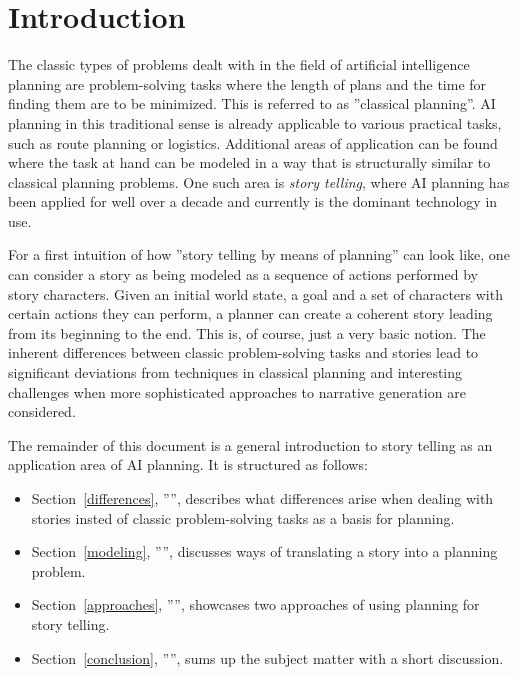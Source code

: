 \section{Introduction}
The classic types of problems dealt with in the field of artificial intelligence planning are problem-solving tasks where the length of plans and the time for finding them are to be minimized. This is referred to as ''classical planning''. AI planning in this traditional sense is already applicable to various practical tasks, such as route planning or logistics. Additional areas of application can be found where the task at hand can be modeled in a way that is structurally similar to classical planning problems. One such area is \emph{story telling}, where AI planning has been applied for well over a decade and currently is the dominant technology in use\cite{Porteous10}.

For a first intuition of how ''story telling by means of planning'' can look like, one can consider a story as being modeled as a sequence of actions performed by story characters. Given an initial world state, a goal and a set of characters with certain actions they can perform, a planner can create a coherent story leading from its beginning to the end. This is, of course, just a very basic notion. The inherent differences between classic problem-solving tasks and stories lead to significant deviations from techniques in classical planning and interesting challenges when more sophisticated approaches to narrative generation are considered.

The remainder of this document is a general introduction to story telling as an application area of AI planning. It is structured as follows:
\begin{itemize}
\item Section~\ref{differences}, '''', describes what differences arise when dealing with stories insted of classic problem-solving tasks as a basis for planning.
\item Section~\ref{modeling}, '''', discusses ways of translating a story into a planning problem.
\item Section~\ref{approaches}, '''', showcases two approaches of using planning for story telling.
\item Section~\ref{conclusion}, '''', sums up the subject matter with a short discussion.
\end{itemize}
